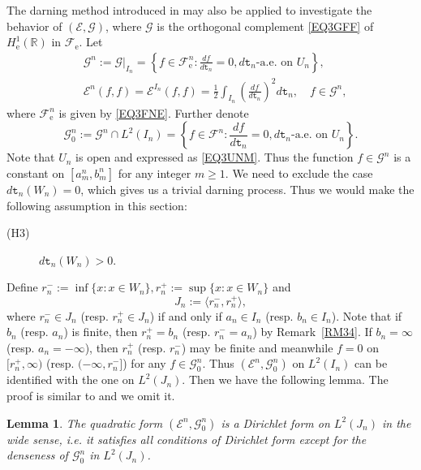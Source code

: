 \documentclass[a4paper]{amsart}
\newtheorem{lemma}[theorem]{Lemma}
\theoremstyle{definition}
\theoremstyle{remark}
\numberwithin{equation}{section}
\begin{document}
The darning method introduced in \cite[\S3.2]{LY14} may also be applied to investigate the behavior of $({{\mathcal{E}}},\mathcal{G})$, where $\mathcal{G}$ is the orthogonal complement \eqref{EQ3GFF} of $H^1_\mathrm{e}(\mathbb{R})$ in ${{\mathcal{F}}}_\mathrm{e}$. Let
\[
\begin{aligned}
	&\mathcal{G}^n:=\mathcal{G}|_{I_n}=\left\{f\in {{\mathcal{F}}}^n_\mathrm{e}: \frac{df}{d{{\mathtt{t}}}_n}=0, d{{\mathtt{t}}}_n\text{-a.e. on }U_n \right\}, \\
	&{{\mathcal{E}}}^n(f,f)={{\mathcal{E}}}^{I_n}(f,f)=\frac{1}{2}\int_{I_n} \left(\frac{df}{d{{\mathtt{t}}}_n}\right)^2d{{\mathtt{t}}}_n,\quad f\in \mathcal{G}^n,
\end{aligned}
\]
where ${{\mathcal{F}}}^n_\mathrm{e}$ is given by \eqref{EQ3FNE}. Further denote
\[
	\mathcal{G}^n_0:=\mathcal{G}^n\cap L^2(I_n)=\left\{f\in {{\mathcal{F}}}^n: \frac{df}{d{{\mathtt{t}}}_n}=0, d{{\mathtt{t}}}_n\text{-a.e. on }U_n \right\}.
\]
Note that $U_n$ is open and expressed as \eqref{EQ3UNM}. Thus the function $f\in \mathcal{G}^n$ is a constant on $[a_m^n, b_m^n]$ for any integer $m\geq 1$. We need to exclude the case $d{{\mathtt{t}}}_n(W_n)=0$, which gives us a trivial darning process. Thus we would make the following assumption in this section:
\begin{description}
\item[(H3)] $d{{\mathtt{t}}}_n(W_n)>0$.
\end{description}
Define $r_n^-:=\inf\{x: x\in W_n\}, r_n^+:=\sup\{x: x\in W_n\}$ and
\[
	J_n:=\langle r^-_n, r^+_n\rangle,
\]
where $r^-_n\in J_n$ (resp. $r^+_n\in J_n$) if and only if $a_n\in I_n$ (resp. $b_n\in I_n$). Note that if $b_n$ (resp. $a_n$) is finite, then $r^+_n=b_n$ (resp. $r^-_n=a_n$) by Remark~\ref{RM34}. If $b_n=\infty$ (resp. $a_n=-\infty$), then $r^+_n$ (resp. $r^-_n$) may be finite and meanwhile $f=0$ on $[r^+_n, \infty)$ (resp. $(-\infty, r^-_n]$) for any $f\in \mathcal{G}^n_0$. Thus $({{\mathcal{E}}}^n, \mathcal{G}^n_0)$ on $L^2(I_n)$ can be identified with the one on $L^2(J_n)$. Then we have the following lemma. The proof is similar to \cite[Lemma~3.2]{LY14} and we omit it.

\begin{lemma}
The quadratic form $({{\mathcal{E}}}^n, \mathcal{G}^n_0)$ is a Dirichlet form on $L^2(J_n)$ in the wide sense, i.e. it satisfies all conditions of Dirichlet form except for the denseness of $\mathcal{G}^n_0$ in $L^2(J_n)$.
\end{lemma}
\end{document}

